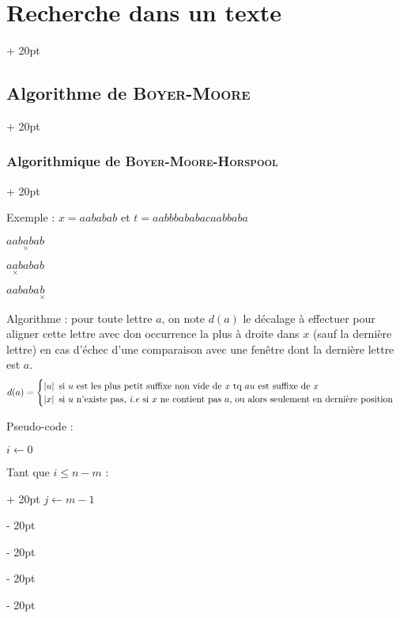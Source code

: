 \documentclass[a4paper, 12pt, twoside]{article}
\newcommand{\abs}[1]{\left\lvert #1 \right\rvert}
\renewcommand{\le}{\leqslant}
\newcommand{\ind}[1][20pt]{\advance\leftskip + #1}
\newcommand{\deind}[1][20pt]{\advance\leftskip - #1}
\newenvironment{indt}[2][20pt]{#2 \par \ind[#1]}{\par \deind} %
\begin{document}
\begin{indt}{\section{Recherche dans un texte}}
\begin{indt}{\subsection{Algorithme de \textsc{Boyer-Moore}}}
\begin{indt}{\subsubsection{Algorithmique de \textsc{Boyer-Moore-Horspool}}}
\begin{center}
                \end{center}

                Exemple : $x = aababab$ et $t = aabbbababacaabbaba$

                $aab\underset{\times} a bab$

                $a \underset \times a babab$

                $aababa\underset \times b$

                \vspace{12pt}
                
                Algorithme : pour toute lettre $a$, on note $d(a)$ le décalage à effectuer pour aligner cette lettre avec don occurrence la plus à droite  dans $x$ (sauf la dernière lettre) en cas d'échec d'une comparaison avec une fenêtre dont la dernière lettre est $a$.
                \[
                    d(a) =
                    \begin{cases}
                        \abs u\ \text{si $u$ est les plus petit suffixe non vide de $x$ tq $au$ est suffixe de $x$}
                        \\
                        \abs x\ \text{si $u$ n'existe pas, \textit{i.e} si $x$ ne contient pas $a$, ou alors seulement en dernière position}
                    \end{cases}
                \]

                Pseudo-code :
                \begin{pseudocode}
                    $i \leftarrow 0$

                    \begin{indt}{Tant que $i \le n - m$ :}
                        $j \leftarrow m - 1$
                        
                        \vspace{6pt}


\end{indt}
\end{pseudocode}
\end{indt}
\end{indt}
\end{indt}
\end{document}
